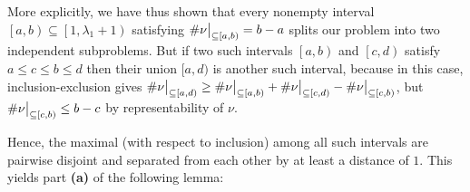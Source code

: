 \documentclass[12pt]{article}
\theoremstyle{plain}
\theoremstyle{definition}
\def\seplistvar{{{\nu}}} %
\begin{document}
More explicitly, we have thus shown that every nonempty interval $\left[a,b\right) \subseteq \left[1, \lambda_1+1\right)$ satisfying $\#\nuab = b-a$ splits our problem into two independent subproblems. But if two such intervals $\left[a,b\right)$ and $\left[c,d\right)$ satisfy $a\leq c\leq b\leq d$ then their union $[a,d)$ is another such interval, because in this case, inclusion-exclusion gives $\#\nuxy{a}{d} \geq \#\nuab + \#\nuxy{c}{d} - \#\nuxy{c}{b}$, but $\#\nuxy{c}{b}\leq b-c$ by representability of $\nu$.
\begin{comment}
\footnote{\textit{Proof.} Assume that two intervals $\left[a,b\right)$ and $\left[c,d\right)$ satisfying $\#\nuab = b-a$ and $\#\nuxy{c}{d} = d-c$ intersect. We need to show that their union is another such interval.
\par We WLOG assume that $a \leq c$. Then, $c \leq b$ (since the intervals intersect). If $b > d$, then the union of the two intervals is simply $\left[a,b\right)$, which makes our claim obvious. Hence, we WLOG assume that $b \leq d$. Thus, $a \leq c \leq b \leq d$. The union of the two intervals is therefore $\left[a, d\right)$, and we must show that $\#\nuxy{a}{d} = d-a$.
A set of positive integers is a subset of both $\left[a, b\right)$ and $\left[c, d\right)$ if and only if it is a subset of $\left[c, b\right)$. On the other hand, a set of positive integers that is a subset of either $\left[a, b\right)$ or $\left[c, d\right)$ must be a subset of $\left[a, d\right)$ (but not conversely). Combining these two observations, we obtain $\#\nuxy{a}{d} \geq \#\nuab + \#\nuxy{c}{d} - \#\nuxy{c}{b}$. Since $\seplistvar$ is representable (or, when $b=c$, for obvious reasons), we have $\#\nuxy{c}{b} \leq b-c$. Thus,
\[
\#\nuxy{a}{d} \geq \underbrace{\#\nuab}_{=b-a} + \underbrace{\#\nuxy{c}{d}}_{=d-c} - \underbrace{\#\nuxy{c}{b}}_{\leq b-c} \geq \left(b-a\right) + \left(d-c\right) - \left(b-c\right) = d-a.
\]
Combined with $\#\nuxy{a}{d} \leq d-a$ (since $\seplistvar$ is representable), this yields $\#\nuxy{a}{d} = d-a$, qed.}.
\end{comment} 
Hence, the maximal (with respect to inclusion) among all such intervals are pairwise disjoint and separated from each other by at least a distance of $1$.
This yields part \textbf{(a)} of the following lemma:
\end{document}
